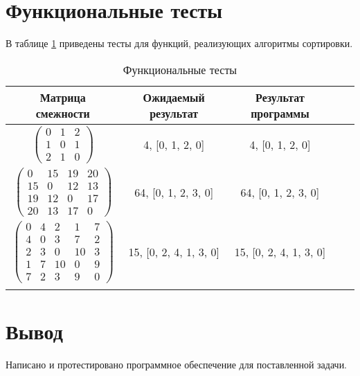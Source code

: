 \FloatBarrier

\section{Функциональные тесты}

В таблице \ref{tbl:functional_test} приведены тесты для функций, реализующих алгоритмы сортировки.

\begin{center}
	\captionsetup{justification=raggedright,singlelinecheck=off}
	\begin{longtable}[c]{|c|c|c|c|c|}\hline
		Матрица смежности & Ожидаемый результат & Результат программы \\
		\hline		
		$ \begin{pmatrix}
			0 & 1 & 2 \\
			1 & 0 & 1 \\
			2 & 1 & 0	
		\end{pmatrix}$ &
		4, [0, 1, 2, 0] &
		4, [0, 1, 2, 0] \\
		
		$ \begin{pmatrix}
			0 & 15 & 19 & 20 \\
			15 &  0 & 12 & 13 \\
			19 & 12 &  0 & 17 \\
			20 & 13 & 17 &  0
		\end{pmatrix}$ &
		64, [0, 1, 2, 3, 0] &
		64, [0, 1, 2, 3, 0] \\
		
		$ \begin{pmatrix}
			0 &  4 &  2 &  1 & 7 \\
			4 &  0 &  3 &  7 & 2 \\
			2 &  3 &  0 & 10 & 3 \\
			1 &  7 & 10 &  0 & 9 \\
			7 &  2 &  3 &  9 & 0
		\end{pmatrix}$ &
		15, [0, 2, 4, 1, 3, 0] &
		15, [0, 2, 4, 1, 3, 0] \\
		\hline
	\caption{Функциональные тесты\label{tbl:functional_test}} \\ 
	\end{longtable}
\end{center}

\FloatBarrier


\section*{Вывод}

Написано и протестировано программное обеспечение для поставленной задачи.
